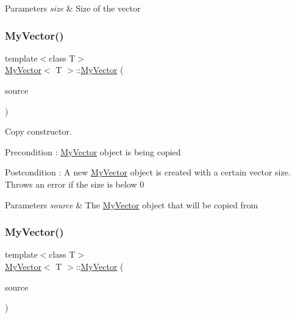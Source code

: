 \begin{DoxyParams}{Parameters}
{\em size} & Size of the vector \\
\hline
\end{DoxyParams}
\mbox{\label{class_my_vector_aaf93995f4a267cc279867c10cfbef623}} 
\subsubsection{\texorpdfstring{MyVector()}{MyVector()}\hspace{0.1cm}{\footnotesize\ttfamily [3/4]}}
{\footnotesize\ttfamily template$<$class T$>$ \\
\mbox{\hyperlink{class_my_vector}{My\+Vector}}$<$ T $>$\+::\mbox{\hyperlink{class_my_vector}{My\+Vector}} (\begin{DoxyParamCaption}\item[{const \mbox{\hyperlink{class_my_vector}{My\+Vector}}$<$ T $>$ \&}]{source }\end{DoxyParamCaption})}



Copy constructor. 

\begin{DoxyPrecond}{Precondition}
\+: \mbox{\hyperlink{class_my_vector}{My\+Vector}} object is being copied 
\end{DoxyPrecond}
\begin{DoxyPostcond}{Postcondition}
\+: A new \mbox{\hyperlink{class_my_vector}{My\+Vector}} object is created with a certain vector size. Throws an error if the size is below 0 
\end{DoxyPostcond}

\begin{DoxyParams}{Parameters}
{\em source} & The \mbox{\hyperlink{class_my_vector}{My\+Vector}} object that will be copied from \\
\hline
\end{DoxyParams}
\mbox{\label{class_my_vector_a7b2d4483f19b1ea3525e49336c857111}} 
\subsubsection{\texorpdfstring{MyVector()}{MyVector()}\hspace{0.1cm}{\footnotesize\ttfamily [4/4]}}
{\footnotesize\ttfamily template$<$class T$>$ \\
\mbox{\hyperlink{class_my_vector}{My\+Vector}}$<$ T $>$\+::\mbox{\hyperlink{class_my_vector}{My\+Vector}} (\begin{DoxyParamCaption}\item[{\mbox{\hyperlink{class_my_vector}{My\+Vector}}$<$ T $>$ \&\&}]{source }\end{DoxyParamCaption})}



